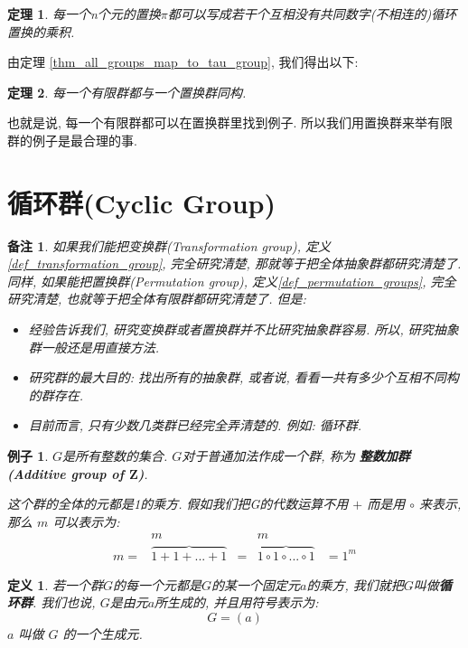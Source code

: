 \documentclass[utf8]{ctexbook}
\newtheorem{theorem}{定理}[section]
\newtheorem{definition}{定义}[section]
\newtheorem{memo}{备注}[section]
\newtheorem{example}{例子}[section]
\begin{document}
\begin{theorem}
每一个n个元的置换$\pi$都可以写成若干个互相没有共同数字(不相连的)循环置换的乘积.
\end{theorem}

由定理 \ref{thm_all_groups_map_to_tau_group}, 我们得出以下:

\begin{theorem}
每一个有限群都与一个置换群同构.
\end{theorem}

也就是说, 每一个有限群都可以在置换群里找到例子. 所以我们用置换群来举有限群的例子是最合理的事.

\section{循环群(Cyclic Group)}

\begin{memo}
如果我们能把变换群(Transformation group), 定义\ref{def_transformation_group}, 完全研究清楚, 那就等于把全体抽象群都研究清楚了. 同样, 如果能把置换群(Permutation group), 定义\ref{def_permutation_groups}, 完全研究清楚, 也就等于把全体有限群都研究清楚了. 但是:

\begin{itemize}
\item{经验告诉我们, 研究变换群或者置换群并不比研究抽象群容易. 所以, 研究抽象群一般还是用直接方法.}
\item{研究群的最大目的: 找出所有的抽象群, 或者说, 看看一共有多少个互相不同构的群存在.}
\item{目前而言, 只有少数几类群已经完全弄清楚的. 例如: 循环群.}
\end{itemize}
\end{memo}

\begin{example}
$G$是所有整数的集合. $G$对于普通加法作成一个群, 称为 \textbf{整数加群(Additive group of $\mathbf{Z}$)}.

这个群的全体的元都是1的乘方. 假如我们把G的代数运算不用 $+$ 而是用 $\circ$ 来表示, 那么 $m$ 可以表示为:
\begin{equation}\nonumber
\begin{array}{ccccc}
 & m & & m &  \\ 
m = & \overbrace{1 + 1 + ... + 1}  & = & \overbrace{1 \circ 1 \circ ... \circ 1 } & = 1^m
\end{array}
\end{equation}
\end{example}

\begin{definition}
若一个群$G$的每一个元都是$G$的某一个固定元$a$的乘方, 我们就把$G$叫做\textbf{循环群}. 我们也说, $G$是由元$a$所生成的, 并且用符号表示为:
\begin{equation}\nonumber
G=(a)
\end{equation}
$a$ 叫做 $G$ 的一个生成元.
\end{definition}
\end{document}
